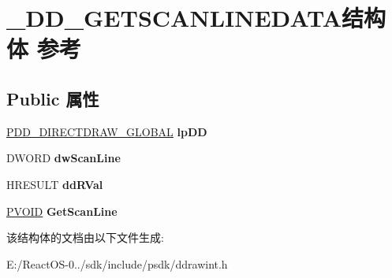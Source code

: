 \hypertarget{struct___d_d___g_e_t_s_c_a_n_l_i_n_e_d_a_t_a}{}\section{\+\_\+\+D\+D\+\_\+\+G\+E\+T\+S\+C\+A\+N\+L\+I\+N\+E\+D\+A\+T\+A结构体 参考}
\label{struct___d_d___g_e_t_s_c_a_n_l_i_n_e_d_a_t_a}
\subsection*{Public 属性}
\begin{DoxyCompactItemize}
\item 
\mbox{\label{struct___d_d___g_e_t_s_c_a_n_l_i_n_e_d_a_t_a_ae8265aa12193b9d2187330ec38341533}} 
\hyperlink{struct___d_d___d_i_r_e_c_t_d_r_a_w___g_l_o_b_a_l}{P\+D\+D\+\_\+\+D\+I\+R\+E\+C\+T\+D\+R\+A\+W\+\_\+\+G\+L\+O\+B\+AL} {\bfseries lp\+DD}
\item 
\mbox{\label{struct___d_d___g_e_t_s_c_a_n_l_i_n_e_d_a_t_a_a3a7685ad7e7beb97eaec6c4a193c979e}} 
D\+W\+O\+RD {\bfseries dw\+Scan\+Line}
\item 
\mbox{\label{struct___d_d___g_e_t_s_c_a_n_l_i_n_e_d_a_t_a_a33a6e9f0b33281ec928367a469c96d9a}} 
H\+R\+E\+S\+U\+LT {\bfseries dd\+R\+Val}
\item 
\mbox{\label{struct___d_d___g_e_t_s_c_a_n_l_i_n_e_d_a_t_a_ad780d242e8c4fe628938a6a64ca5fd67}} 
\hyperlink{interfacevoid}{P\+V\+O\+ID} {\bfseries Get\+Scan\+Line}
\end{DoxyCompactItemize}


该结构体的文档由以下文件生成\+:\begin{DoxyCompactItemize}
\item 
E\+:/\+React\+O\+S-\/0../sdk/include/psdk/ddrawint.\+h\end{DoxyCompactItemize}
